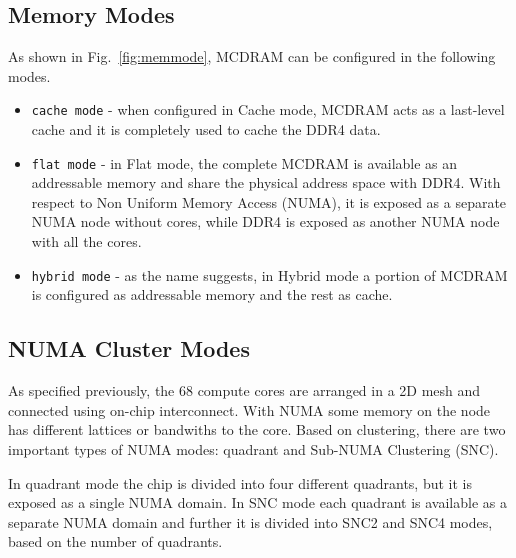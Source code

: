 \subsection{Memory Modes}
\label{src:knl/config}
As shown in Fig.~\ref{fig:memmode}, MCDRAM can be configured in the
following modes.
\begin{itemize}
    \item \texttt{cache mode} - when configured in Cache mode,
    MCDRAM acts as a last-level cache and it is completely used to
    cache the DDR4 data. %
    \item \texttt{flat mode} - in Flat mode, the complete
    MCDRAM is available as an addressable memory and share the
    physical address space with DDR4. With respect to Non Uniform
    Memory Access (NUMA), it is exposed as a separate NUMA node
    without cores, while DDR4 is exposed as another NUMA node with
    all the cores.
    \item \texttt{hybrid mode} - as the name suggests, in
    Hybrid mode a portion of MCDRAM is configured as addressable
    memory and the rest as cache.
\end{itemize}

\subsection{NUMA Cluster Modes}
\label{src:knl/cluster}
As specified previously, the 68 compute cores are arranged in a 2D
mesh and connected using on-chip interconnect. With NUMA some memory
on the node has different lattices or bandwiths to the core. Based on
clustering, there are two important types of NUMA modes: quadrant and
Sub-NUMA Clustering (SNC).

In quadrant mode the chip is divided into four different quadrants, but
it is exposed as a single NUMA domain. In SNC mode each quadrant is
available as a separate NUMA domain and further it is divided into
SNC2 and SNC4 modes, based on the number of quadrants.
